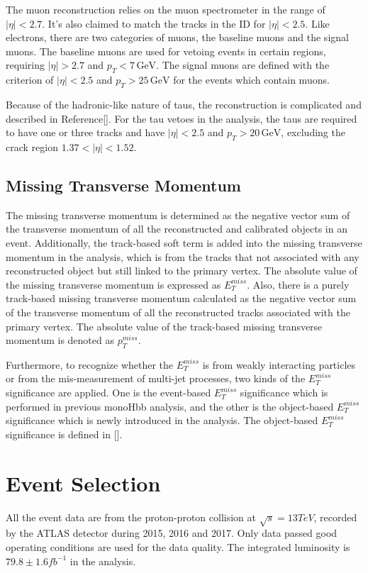 \documentclass[class=NTHU_thesis, crop=false]{standalone}
\begin{document}
The muon reconstruction relies on the muon spectrometer in the range of $\left|\eta\right| < 2.7$. It's also claimed to match the tracks in the ID for $\left|\eta\right| < 2.5$. Like electrons, there are two categories of muons, the baseline muons and the signal muons. The baseline muons are used for vetoing events in certain regions, requiring $\left|\eta\right| > 2.7$ and $p_T < 7\, \mathrm{GeV}$. The signal muons are defined with the criterion of $\left|\eta\right| < 2.5$ and $p_T > 25\, \mathrm{GeV}$ for the events which contain muons.

Because of the hadronic-like nature of taus, the reconstruction is complicated and described in Reference[]. For the tau vetoes in the analysis, the taus are required to have one or three tracks and have $\left|\eta\right| < 2.5$ and $p_T > 20\, \mathrm{GeV}$, excluding the crack region $1.37 < \left|\eta\right| < 1.52$.

\subsection{Missing Transverse Momentum}
The missing transverse momentum is determined as the negative vector sum of the transverse momentum of all the reconstructed and calibrated objects in an event. Additionally, the track-based soft term is added into the missing transverse momentum in the analysis, which is from the tracks that not associated with any reconstructed object but still linked to the primary vertex. The absolute value of the missing transverse momentum is expressed as $E^{miss}_T$. Also, there is a purely track-based missing transverse momentum calculated as the negative vector sum of the transverse momentum of all the reconstructed tracks associated with the primary vertex. The absolute value of the track-based missing transverse momentum is denoted as $p^{miss}_T$.

Furthermore, to recognize whether the $E^{miss}_T$ is from weakly interacting particles or from the mis-measurement of multi-jet processes, two kinds of the $E^{miss}_T$ significance are applied. One is the event-based $E^{miss}_T$ significance which is performed in previous monoHbb analysis, and the other is the object-based $E^{miss}_T$ significance which is newly introduced in the analysis. The object-based $E^{miss}_T$ significance is defined in [].

\section{Event Selection}
All the event data are from the proton-proton collision at $\sqrt{s} = 13 TeV$, recorded by the ATLAS detector during 2015, 2016 and 2017. Only data passed good operating conditions are used for the data quality. The integrated luminosity is $79.8 \pm 1.6 fb^{-1}$ in the analysis.
\end{document}
